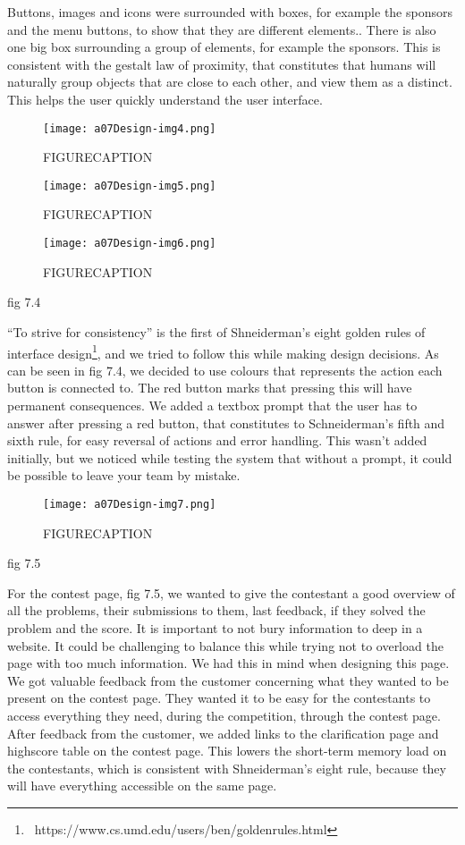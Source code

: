 Buttons, images and icons were surrounded with boxes, for example the
sponsors and the menu buttons, to show that they are different
elements.. There is also one big box surrounding a group of elements,
for example the sponsors. This is consistent with the gestalt law of
proximity, that constitutes that humans will naturally group objects
that are close to each other, and view them as a distinct.
This helps the user quickly understand the user interface.


 \begin{figure}[h!]
	\texttt{[image: a07Design-img4.png]} 
	\caption{FIGURECAPTION}
\end{figure}
\begin{figure}[h!]
	\texttt{[image: a07Design-img5.png]} 
	\caption{FIGURECAPTION}
\end{figure}
\begin{figure}[h!]
	\texttt{[image: a07Design-img6.png]} 
	\caption{FIGURECAPTION}
\end{figure}
fig 7.4

``To strive for consistency'' is the
first of Shneiderman's eight golden rules of interface
design\footnote{\ https://www.cs.umd.edu/users/ben/goldenrules.html},
and we tried to follow this while making design decisions. As can be
seen in fig 7.4, we decided to use colours that represents the action
each button is connected to. The red button marks that pressing this
will have permanent consequences. We added a textbox prompt that the
user has to answer after pressing a red button, that constitutes to
Schneiderman's fifth and sixth rule, for easy reversal
of actions and error handling. This wasn't added
initially, but we noticed while testing the system that without a
prompt, it could be possible to leave your team by mistake.
 \begin{figure}[h!]
	\texttt{[image: a07Design-img7.png]} 
	\caption{FIGURECAPTION}
\end{figure}
fig 7.5

For the contest page, fig 7.5, we wanted to give the contestant a good
overview of all the problems, their submissions to them, last feedback,
if they solved the problem and the score. It is important to not bury
information to deep in a website. It could be challenging to balance
this while trying not to overload the page with too much information.
We had this in mind when designing this page. We got valuable feedback
from the customer concerning what they wanted to be present on the
contest page. They wanted it to be easy for the contestants to access
everything they need, during the competition, through the contest page.
After feedback from the customer, we added links to the clarification
page and highscore table on the contest page. This lowers the
short-term memory load on the contestants, which is consistent with
Shneiderman's eight rule, because they will have
everything accessible on the same page.


